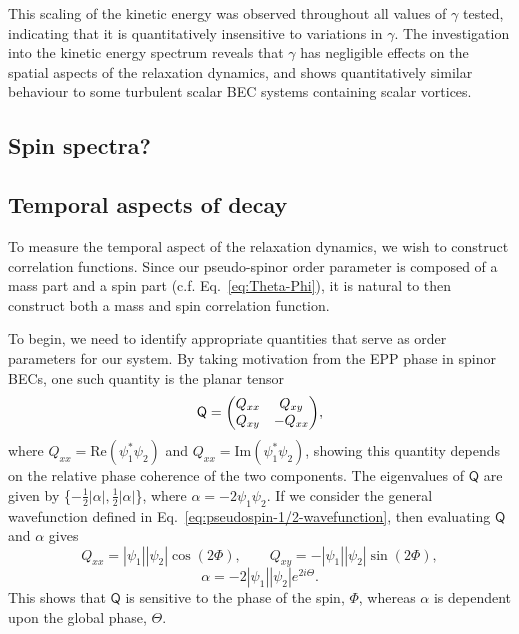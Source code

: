 This scaling of the kinetic energy was observed throughout all values of
$\gamma$ tested, indicating that it is quantitatively insensitive to variations
in $\gamma$.
The investigation into the kinetic energy spectrum reveals that $\gamma$ has
negligible effects on the spatial aspects of the relaxation dynamics, and shows
quantitatively similar behaviour to some turbulent scalar BEC systems
containing scalar vortices.

\subsection{Spin spectra?}

\subsection{Temporal aspects of decay}
To measure the temporal aspect of the relaxation dynamics, we wish to
construct correlation functions.
Since our pseudo-spinor order parameter is composed of a mass part and a spin
part (c.f. Eq.~\eqref{eq:Theta-Phi}), it is natural to then construct both a
mass and spin correlation function.\par
To begin, we need to identify appropriate quantities that serve as order
parameters for our system.
By taking motivation from the EPP phase in spinor BECs, one such quantity is
the planar tensor~\cite{Symes2017}
\begin{equation}
    \mathsf{Q} = \mqty(Q_{xx} & Q_{xy} \\ Q_{xy} & -Q_{xx}),
\end{equation}
where $Q_{xx} = \mathrm{Re}(\psi_1^*\psi_2)$ and
$Q_{xx} = \mathrm{Im}(\psi_1^*\psi_2)$, showing this quantity depends on the
relative phase coherence of the two components.
The eigenvalues of $\mathsf{Q}$ are given by
\{$-\frac{1}{2}|\alpha|, \frac{1}{2}|\alpha|$\}, where
$\alpha=-2\psi_1\psi_2$.
If we consider the general wavefunction defined in
Eq.~\eqref{eq:pseudospin-1/2-wavefunction}, then evaluating $\mathsf{Q}$ and
$\alpha$ gives
\begin{equation}
    Q_{xx} = |\psi_1||\psi_2|\cos({2\Phi}), \qquad 
    Q_{xy} = -|\psi_1||\psi_2|\sin({2\Phi}),
\end{equation}
\begin{equation}
    \alpha = -2|\psi_1||\psi_2|e^{2i\Theta}.
\end{equation}
This shows that $\mathsf{Q}$ is sensitive to the phase of the spin,
$\Phi$, whereas $\alpha$ is dependent upon the global phase, $\Theta$.\\
